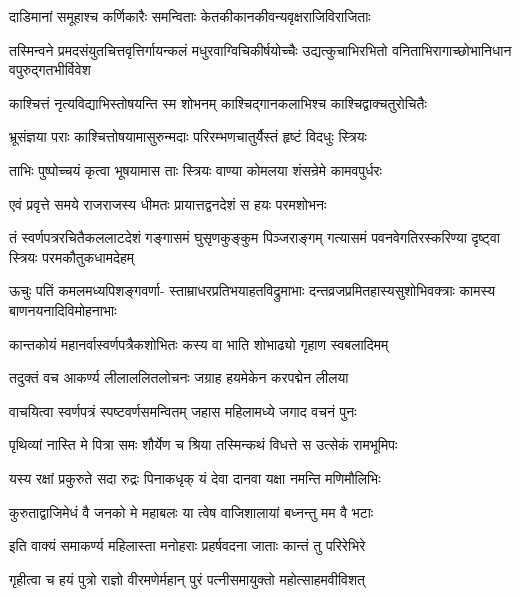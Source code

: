 \twolineshloka
{दाडिमानां समूहाश्च कर्णिकारैः समन्विताः}
{केतकीकानकीवन्यवृक्षराजिविराजिताः}%

\twolineshloka
{तस्मिन्वने प्रमदसंयुतचित्तवृत्तिर्गायन्कलं मधुरवाग्विचिकीर्षयोच्चैः}
{उद्यत्कुचाभिरभितो वनिताभिरागाच्छोभानिधान वपुरुद्गतभीर्विवेश}%

\twolineshloka
{काश्चित्तं नृत्यविद्याभिस्तोषयन्ति स्म शोभनम्}
{काश्चिद्गानकलाभिश्च काश्चिद्वाक्चतुरोचितैः}%

\twolineshloka
{भ्रूसंज्ञया पराः काश्चित्तोषयामासुरुन्मदाः}
{परिरम्भणचातुर्यैस्तं हृष्टं विदधुः स्त्रियः}%

\twolineshloka
{ताभिः पुष्पोच्चयं कृत्वा भूषयामास ताः स्त्रियः}
{वाण्या कोमलया शंसन्रेमे कामवपुर्धरः}%

\twolineshloka
{एवं प्रवृत्ते समये राजराजस्य धीमतः}
{प्रायात्तद्वनदेशं स हयः परमशोभनः}%

\fourlineindentedshloka
{तं स्वर्णपत्ररचितैकललाटदेशं}
{गङ्गासमं घुसृणकुङ्कुम पिञ्जराङ्गम्}
{गत्यासमं पवनवेगतिरस्करिण्या}
{दृष्ट्वा स्त्रियः परमकौतुकधामदेहम्}%

\fourlineindentedshloka
{ऊचुः पतिं कमलमध्यपिशङ्गवर्णा-}
{स्ताम्राधरप्रतिभयाहतविद्रुमाभाः}
{दन्तव्रजप्रमितहास्यसुशोभिवक्त्राः}
{कामस्य बाणनयनादिविमोहनाभाः}%


\twolineshloka
{कान्तकोयं महानर्वास्वर्णपत्रैकशोभितः}
{कस्य वा भाति शोभाढ्यो गृहाण स्वबलादिमम्}%


\twolineshloka
{तदुक्तं वच आकर्ण्य लीलाललितलोचनः}
{जग्राह हयमेकेन करपद्मेन लीलया}%

\twolineshloka
{वाचयित्वा स्वर्णपत्रं स्पष्टवर्णसमन्वितम्}
{जहास महिलामध्ये जगाद वचनं पुनः}%


\twolineshloka
{पृथिव्यां नास्ति मे पित्रा समः शौर्येण च श्रिया}
{तस्मिन्कथं विधत्ते स उत्सेकं रामभूमिपः}%

\twolineshloka
{यस्य रक्षां प्रकुरुते सदा रुद्रः पिनाकधृक्}
{यं देवा दानवा यक्षा नमन्ति मणिमौलिभिः}%

\twolineshloka
{कुरुताद्वाजिमेधं वै जनको मे महाबलः}
{या त्वेष वाजिशालायां बध्नन्तु मम वै भटाः}%

\twolineshloka
{इति वाक्यं समाकर्ण्य महिलास्ता मनोहराः}
{प्रहर्षवदना जाताः कान्तं तु परिरेभिरे}%

\twolineshloka
{गृहीत्वा च हयं पुत्रो राज्ञो वीरमणेर्महान्}
{पुरं पत्नीसमायुक्तो महोत्साहमवीविशत्}%

